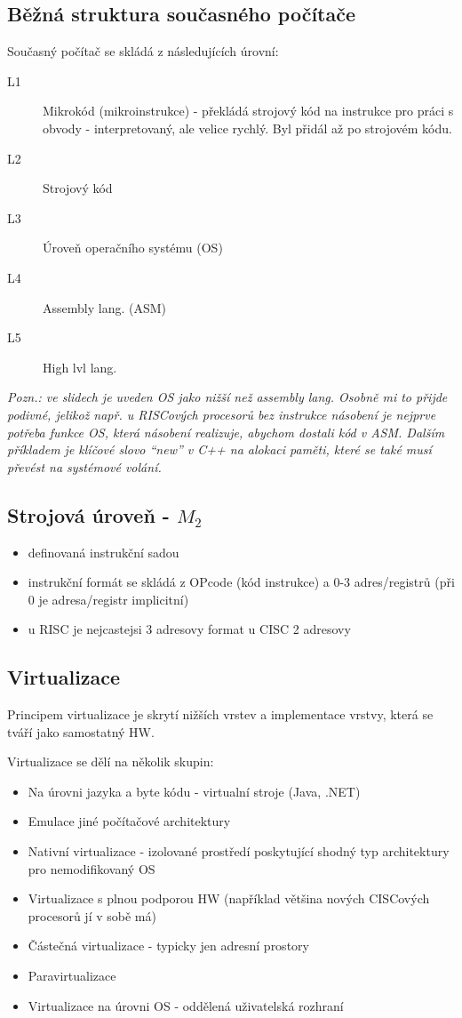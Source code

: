 \documentclass[10pt,a4paper,openright]{article}
\begin{document}
\subsection{Běžná struktura současného počítače}
Současný počítač se skládá z následujících úrovní:
\begin{description}

\item[L1] Mikrokód (mikroinstrukce) - překládá strojový kód na instrukce pro práci s obvody - interpretovaný, ale velice rychlý. Byl přidál až po strojovém kódu.
\item[L2] Strojový kód
\item[L3] Úroveň operačního systému (OS)
\item[L4] Assembly lang. (ASM)
\item[L5] High lvl lang. 
\end{description}

\textit{Pozn.: ve slidech je uveden OS jako nižší než assembly lang. Osobně mi to přijde podivné, jelikož např. u RISCových procesorů bez instrukce násobení je nejprve potřeba funkce OS, která násobení realizuje, abychom dostali kód v ASM. Dalším příkladem je klíčové slovo ``new'' v C++ na alokaci paměti, které se také musí převést na systémové volání.}

\subsection{Strojová úroveň - $M_2$}
\begin{itemize}
\item definovaná instrukční sadou
\item instrukční formát se skládá z OPcode (kód instrukce) a 0-3 adres/registrů (při 0 je adresa/registr implicitní)
\item u RISC je nejcastejsi 3 adresovy format u CISC 2 adresovy
\end{itemize}

\subsection{Virtualizace}
Principem virtualizace je skrytí nižších vrstev a implementace vrstvy, která se tváří jako samostatný HW.

Virtualizace se dělí na několik skupin:

\begin{itemize}
\item Na úrovni jazyka a byte kódu - virtualní stroje (Java, .NET)
\item Emulace jiné počítačové architektury
\item Nativní virtualizace - izolované prostředí poskytující shodný typ architektury pro nemodifikovaný OS
\item Virtualizace s plnou podporou HW (například většina nových CISCových procesorů jí v sobě má)
\item Částečná virtualizace - typicky jen adresní prostory
\item Paravirtualizace
\item Virtualizace na úrovni OS - oddělená uživatelská rozhraní
\end{itemize}
\end{document}
